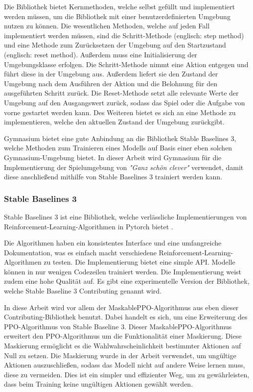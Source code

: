 Die Bibliothek bietet Kernmethoden, welche selbst gefüllt und implementiert werden müssen, um die Bibliothek mit einer benutzerdefinierten Umgebung nutzen zu können. Die wesentlichen Methoden, welche auf jeden Fall implementiert werden müssen, sind die Schritt-Methode (englisch: step method) und eine Methode zum Zurücksetzen der Umgebung auf den Startzustand (englisch: reset method). Außerdem muss eine Initialisierung der Umgebungsklasse erfolgen. Die Schritt-Methode nimmt eine Aktion entgegen und führt diese in der Umgebung aus. Außerdem liefert sie den Zustand der Umgebung nach dem Ausführen der Aktion und die Belohnung für den ausgeführten Schritt zurück. Die Reset-Methode setzt alle relevante Werte der Umgebung auf den Ausgangswert zurück, sodass das Spiel oder die Aufgabe von vorne gestartet werden kann. Des Weiteren bietet es sich an eine Methode zu implementieren, welche den aktuellen Zustand der Umgebung zurückgibt.

Gymnasium bietet eine gute Anbindung an die Bibliothek Stable Baselines 3, welche Methoden zum Trainieren eines Modells auf Basis einer eben solchen Gymnasium-Umgebung bietet. In dieser Arbeit wird Gymnasium für die Implementierung der Spielumgebung von \textit{"Ganz schön clever"} verwendet, damit diese anschließend mithilfe von Stable Baselines 3 trainiert werden kann.
\subsubsection{Stable Baselines 3}
Stable Baselines 3 ist eine Bibliothek, welche verlässliche Implementierungen von Reinforcement-Learning-Algorithmen in Pytorch bietet \cite[S. 1]{stable-baselines3}. 

Die Algorithmen haben ein konsistentes Interface und eine umfangreiche Dokumentation, was es einfach macht verschiedene Reinforcement-Learning-Algorithmen zu testen. Die Implementierung bietet eine simple API. Modelle können in nur wenigen Codezeilen trainiert werden. Die Implementierung weist zudem eine hohe Qualität auf. Es gibt eine experimentelle Version der Bibliothek, welche Stable Baseline 3 Contributing genannt wird. \cite[S. 1-3]{stable-baselines3}

In diese Arbeit wird vor allem der MaskablePPO-Algorithmus aus eben dieser Contributing-Bibliothek benutzt. Dabei handelt es sich, um eine Erweiterung des PPO-Algorithmus von Stable Baseline 3. Dieser MaskablePPO-Algorithmus erweitert den PPO-Algorithmus um die Funktionalität einer Maskierung. Diese Maskierung ermöglicht es die Wahlwahrscheinlichkeit bestimmter Aktionen auf Null zu setzen. Die Maskierung wurde in der Arbeit verwendet, um ungültige Aktionen auszuschließen, sodass das Modell nicht auf andere Weise lernen muss, diese zu vermeiden. Dies ist ein simpler und effizienter Weg, um zu gewährleisten, dass beim Training keine ungültigen Aktionen gewählt werden.
